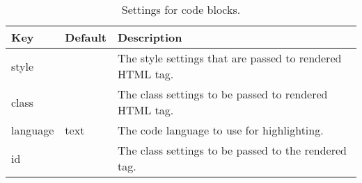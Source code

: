 \begin{table}
\center\caption{\label{code-settings}Settings for code blocks.}\par\begin{tabulary}{\textwidth}{LLL}
\toprule
Key &Default &Description \\
\midrule
style & &The style settings that are passed to rendered HTML tag. \\
class & &The class settings to be passed to rendered HTML tag. \\
language &text &The code language to use for highlighting. \\
id & &The class settings to be passed to the rendered tag. \\
\bottomrule
\end{tabulary}

\end{table}
